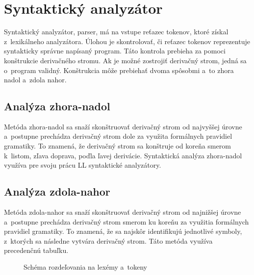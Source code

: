 \section{Syntaktický analyzátor}
Syntaktický analyzátor, parser, má na vstupe reťazec tokenov, ktoré získal
z~lexikálneho analyzátora. Úlohou je skontrolovať, či
reťazec tokenov reprezentuje syntakticky správne napísaný program. Táto kontrola
prebieha za pomoci konštrukcie derivačného stromu. Ak je možné zostrojiť derivačný strom,
jedná sa o~program validný. Konštrukcia môže prebiehať dvoma spôsobmi a~to zhora
nadol a~zdola nahor\cite{meduna}. 

\subsection{Analýza zhora-nadol}
Metóda zhora-nadol sa snaží skonštruovať derivačný strom od najvyššej úrovne a~postupne prechádza derivačný strom dole za využita formálnych pravidiel gramatiky. To znamená, že derivačný strom sa konštruje od koreňa smerom k~listom, zľava doprava, poďla ľavej derivácie. Syntaktická analýza zhora-nadol využíva pre svoju prácu LL syntaktické analyzátory\cite{aho}.

\subsection{Analýza zdola-nahor}
Metóda zdola-nahor sa snaží skonštruovať derivačný strom od najnižšej úrovne a~postupne prechádza derivačný strom smerom ku koreňu za využitia formálnych pravidiel gramatiky. To znamená, že sa najskôr identifikujú jednotlivé symboly, z~ktorých sa následne vytvára derivačný strom. Táto metóda využíva precedenčnú tabuľku\cite{aho}.

\begin{center}
\begin{figure}
\caption{Schéma rozdeľovania na lexémy a~tokeny}
\label{fig:lex}
\end{figure}
\end{center}

